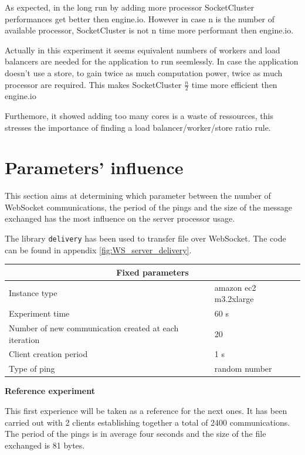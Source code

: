 As expected, in the long run by adding more processor SocketCluster
performances get better then engine.io. However in case n is the number of
available processor, SocketCluster is not n time more performant then
engine.io.

Actually in this experiment it seems equivalent numbers of workers and load
balancers are needed for the application to run seemlessly. In case the
application doesn't use a store, to gain twice as much computation power, twice
as much processor are required. This makes SocketCluster $\frac{n}{2}$ time
more efficient then engine.io

Furthemore, it showed adding too many cores is a waste of ressources, this
stresses the importance of finding a load balancer/worker/store ratio rule.

\section{Parameters' influence}

This section aims at determining which parameter between the number of
WebSocket communications, the period of the pings and the size of the message
exchanged has the most influence on the server processor usage. 

The library \texttt{delivery} has been used to transfer file over WebSocket.
The code can be found in appendix \ref{fig:WS_server_delivery}.

\begin{center}
  \begin{tabular}{ | l | l |}
  \hline
  \multicolumn{2}{|c|}{Fixed parameters} \\
  \hline
    Instance type &  amazon ec2 m3.2xlarge\\ 
    Experiment time & 60 s \\
    Number of new communication created at each iteration & 20 \\
    Client creation period & 1 s \\
    Type of ping & random number \\ 
  \hline
  \end{tabular}
\end{center}

\textbf{Reference experiment}

This first experience will be taken as a reference for the next ones. It has been
carried out with 2 clients establishing together a total of 2400
communications.  The period of the pings is in average four seconds and the
size of the file exchanged is 81 bytes.


